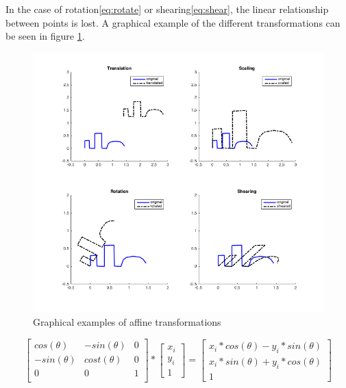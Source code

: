 \documentclass[
    floatsintext
]{article}
\begin{document}
In the case of rotation\eqref{eq:rotate} or shearing\eqref{eq:shear}, the linear relationship between points is lost.
A graphical example of the different transformations can be seen in figure \ref{fig:affine_transform}.

\begin{figure}[h]
  \centering
  \includegraphics[width=1\textwidth]{./figures/affine_transform.png}
  \caption{Graphical examples of affine transformations}
  \label{fig:affine_transform}
\end{figure}  

\begin{equation}
  \begin{bmatrix}
    cos(\theta)  & -sin(\theta) &   0 \\
    -sin(\theta) & cost(\theta) &   0 \\
    	0   	 &	0       &   1 \\ 
  \end{bmatrix} 
  *
  \begin{bmatrix}
    x_i \\ y_i \\ 1
  \end{bmatrix} 
  = 
  \begin{bmatrix}
    x_i * cos(\theta) - y_i * sin(\theta) \\ x_i * sin(\theta) + y_i * cos(\theta) \\ 1
  \end{bmatrix} 
  \label{eq:rotate}
\end{equation}
\end{document}
